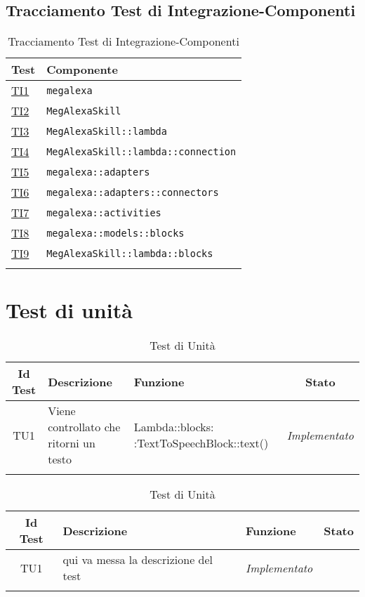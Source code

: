 \subsection{Tracciamento Test di Integrazione-Componenti}
\normalsize
\begin{longtable}{|>{\centering}m{3cm}|m{9cm}<{\centering}|}
\hline
\textbf{Test} & \textbf{Componente}\\
\hline
\endhead
\hyperlink{TI1}{TI1} & \texttt{megalexa}\\ \hline
\hyperlink{TI2}{TI2} & \texttt{MegAlexaSkill}\\ \hline
\hyperlink{TI3}{TI3} & \texttt{MegAlexaSkill::lambda}\\ \hline
\hyperlink{TI4}{TI4} & \texttt{MegAlexaSkill::lambda::connection}\\ \hline
\hyperlink{TI5}{TI5} & \texttt{megalexa::adapters}\\ \hline
\hyperlink{TI6}{TI6} & \texttt{megalexa::adapters::connectors}\\ \hline
\hyperlink{TI7}{TI7} & \texttt{megalexa::activities}\\ \hline
\hyperlink{TI8}{TI8} & \texttt{megalexa::models::blocks}\\ \hline
\hyperlink{TI9}{TI9} & \texttt{MegAlexaSkill::lambda::blocks}\\ \hline
\caption[Tracciamento Test di Integrazione-Componenti]{Tracciamento Test di Integrazione-Componenti}
\label{tabella:ts-requi}
\end{longtable}
\clearpage


\section{Test di unità}

\normalsize
\begin{longtable}{|c|m{9em}|>{}m{9em}|c|}
\hline 
\textbf{Id Test} & \textbf{Descrizione} & \textbf{Funzione} & \textbf{Stato}\\
\hline
\endhead
{TU1} & Viene controllato che ritorni un testo & Lambda::blocks: :TextToSpeechBlock::text() & \textit{Implementato}\\ \hline
\caption[Test di Unità]{Test di Unità}
\label{tabella:test2}
\end{longtable}
\clearpage

\normalsize
\begin{longtable}{|c|m{9em}|>{}m{9em}|c|}
\hline 
\textbf{Id Test} & \textbf{Descrizione} & \textbf{Funzione} & \textbf{Stato}\\
\hline
\endhead
{TU1} & qui va messa la descrizione del test & \textit{Implementato}\\ \hline
\caption[Test di Unità]{Test di Unità}
\label{tabella:test2}
\end{longtable}
\clearpage